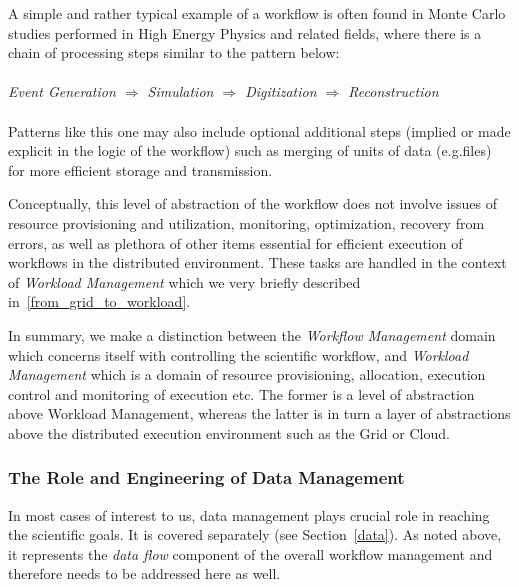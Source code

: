 A simple and rather typical example of a workflow is often found in Monte Carlo studies performed in High Energy Physics and related fields, where there is a chain of processing steps similar to the pattern below:
\\
\\
\textit{Event  Generation $\Longrightarrow$ Simulation $\Longrightarrow$ Digitization $\Longrightarrow$ Reconstruction}
\\
\\
Patterns like this one may also include optional additional steps (implied or made explicit in the logic of the workflow) such as merging of units of data (e.g.files) for more efficient storage and transmission.

Conceptually, this level of abstraction of the workflow does not  involve issues of resource provisioning and utilization, monitoring, optimization, recovery from errors, as well as plethora of other items essential
for efficient execution of workflows in the distributed environment. These tasks are handled in the context of \textit{Workload Management} which we very briefly described in~\ref{from_grid_to_workload}.

In summary, we make a distinction between the \textit{Workflow Management} domain which concerns itself with controlling the scientific workflow, and \textit{Workload Management} which
is a domain of resource provisioning, allocation, execution control and monitoring of execution etc. The former is a level of abstraction above Workload Management, whereas the latter is in
turn a layer of abstractions above the distributed execution environment such as the Grid or Cloud.


\subsubsection{The Role and Engineering of Data Management}
In most cases of interest to us, data management plays crucial role in reaching the scientific goals. It is covered separately (see Section~\ref{data}).
As noted above, it represents the \textit{data flow} component of the overall workflow management and therefore needs to be addressed here as well.


